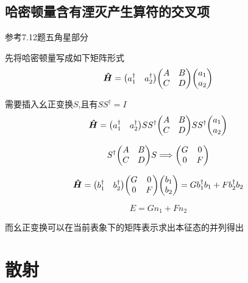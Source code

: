 \documentclass{article}
\begin{document}
        \subsection{哈密顿量含有湮灭产生算符的交叉项}
            参考7.12题五角星部分
            
            先将哈密顿量写成如下矩阵形式
            $$
            \vu*{H} = \mqty(a^{\dagger}_{1} & a^{\dagger}_{2}) \mqty(A & B \\ C & D) \mqty(a_{1} \\ a_{2})
            $$

            需要插入幺正变换$S$,且有$SS^{\dagger} = I$
            $$
            \vu*{H} = \mqty(a^{\dagger}_{1} & a^{\dagger}_{2}) SS^{\dagger} \mqty(A & B \\ C & D)  SS^{\dagger} \mqty(a_{1} \\ a_{2})
            $$

            $$
            S^{\dagger} \mqty(A & B \\ C & D) S \lra \mqty(G & 0 \\ 0 & F)
            $$

            $$
            \vu*{H} = \mqty(b^{\dagger}_{1} & b^{\dagger}_{2})  \mqty(G & 0 \\ 0 & F) \mqty(b_{1} \\ b_{2}) = G b^{\dagger}_{1} b_{1} + Fb^{\dagger}_{2}b_{2} 
            $$

            $$
            E = G n_{1} + F n_{2}
            $$
            
            而幺正变换可以在当前表象下的矩阵表示求出本征态的并列得出

    \section{散射}
    
    


  
\end{document}
